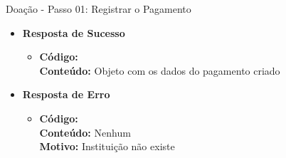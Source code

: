 \begin{caixa}{Doação - Passo 01: Registrar o Pagamento}{}
\begin{itemize}
\item \textbf{Resposta de Sucesso}
	\begin{itemize}
		\item \textbf{Código:}  \\ \textbf{Conteúdo:} Objeto  com os dados do pagamento criado
	\end{itemize}

\item \textbf{Resposta de Erro}
	\begin{itemize}
		\item \textbf{Código:}  \\ \textbf{Conteúdo:} Nenhum \\ \textbf{Motivo:} Instituição não existe
	\end{itemize}

\end{itemize}
\end{caixa}


